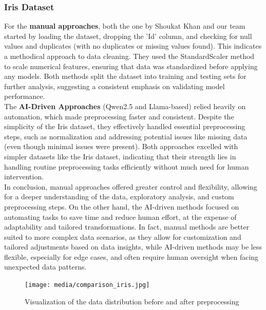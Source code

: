 \subsubsection{Iris Dataset}
For the \textbf{manual approaches}, both the one by Shoukat Khan and our team
started by loading the dataset, dropping the 'Id' column, and checking for null
values and duplicates (with no duplicates or missing values found). This
indicates a methodical approach to data cleaning. They used the StandardScaler
method to scale numerical features, ensuring that data was standardized before
applying any models. Both methods split the dataset into training and testing
sets for further analysis, suggesting a consistent emphasis on validating model
performance.\\ 
The \textbf{AI-Driven Approaches} (Qwen2.5 and Llama-based) 
relied heavily on automation, which made preprocessing faster and 
consistent. Despite the simplicity of the Iris dataset, they
effectively handled essential preprocessing steps, such as normalization and
addressing potential issues like missing data (even though minimal issues were
present). Both approaches excelled with simpler datasets like the Iris dataset,
indicating that their strength lies in handling routine preprocessing tasks
efficiently without much need for human intervention.\\ 
In conclusion, manual
approaches offered greater control and flexibility, allowing for a deeper
understanding of the data, exploratory analysis, and custom preprocessing
steps. On the other hand, the AI-driven methods focused on automating tasks to
save time and reduce human effort, at the expense of adaptability and tailored
transformations. In fact, manual methods are better suited to more complex data
scenarios, as they allow for customization and tailored adjustments based on
data insights, while AI-driven methods may be less flexible, especially for
edge cases, and often require human oversight when facing unexpected data
patterns.

\begin{figure}[H]
    \centering
    \texttt{[image: media/comparison\_iris.jpg]}
    \caption{Visualization of the data distribution before and after preprocessing}\label{fig:comparison-iris}
\end{figure}